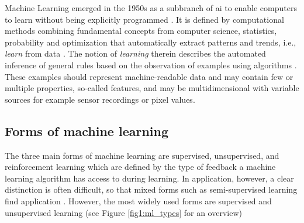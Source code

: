 Machine Learning emerged in the 1950s as a subbranch of \gls{ai} to enable computers to learn without being explicitly programmed \cite{Samual1959}. It is defined by computational methods combining fundamental concepts from computer science, statistics, probability and optimization that automatically extract patterns and trends, i.e., \textit{learn} from data \cite{Hastie2009}. The notion of \textit{learning} therein describes the automated inference of general rules based on the observation of examples using algorithms \cite{Von_luxburg2011}. These examples should represent machine-readable data and may contain few or multiple properties, so-called features, and may be multidimensional with variable sources for example sensor recordings or pixel values. 

\subsection{Forms of machine learning}
The three main forms of machine learning are supervised, unsupervised, and reinforcement learning which are defined by the type of feedback a machine learning algorithm has access to during learning. In application, however, a clear distinction is often difficult, so that mixed forms such as semi-supervised learning find application \cite{Russell2015}. However, the most widely used forms are supervised and unsupervised learning (see Figure \ref{fig1:ml_types} for an overview) 

